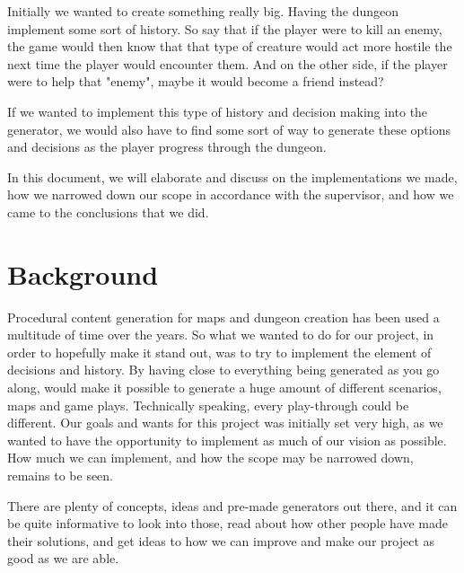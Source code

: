 \documentclass[conference,compsoc]{IEEEtran}
\begin{document}
Initially we wanted to create something really big. Having the dungeon implement some sort of history. So say that if the player were to kill an enemy, the game would then know that that type of creature would act more hostile the next time the player would encounter them. And on the other side, if the player were to help that "enemy", maybe it would become a friend instead?

If we wanted to implement this type of history and decision making into the generator, we would also have to find some sort of way to generate these options and decisions as the player progress through the dungeon.

In this document, we will elaborate and discuss on the implementations we made, how we narrowed down our scope in accordance with the supervisor, and how we came to the conclusions that we did.
	
\section{Background}
Procedural content generation for maps and dungeon creation has been used a multitude of time over the years. So what we wanted to do for our project, in order to hopefully make it stand out, was to try to  implement the element of decisions and history. By having close to everything being generated as you go along, would make it possible to generate a huge amount of different scenarios, maps and game plays. Technically speaking, every play-through could be different. 
Our goals and wants for this project was initially set very high, as we wanted to have the opportunity to implement as much of our vision as possible. How much we can implement, and how the scope may be narrowed down, remains to be seen.

There are plenty of concepts, ideas and pre-made generators out there, and it can be quite informative to look into those, read about how other people have made their solutions, and get ideas to how we can improve and make our project as good as we are able.
\end{document}
